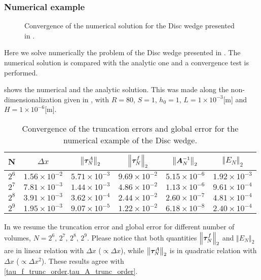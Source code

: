 \subsubsection*{Numerical example}
\begin{figure}[ht]
\centering 
\def\svgwidth{\textwidth}\small{
}\caption{
Convergence of the numerical solution for the Disc wedge presented in .
}\label{fig:discofinito_convergence}
\end{figure}

Here we solve numerically the problem of the Disc wedge presented in . The numerical solution is compared with the analytic one and a convergence test is performed.

 shows the numerical and the analytic solution. This was made along the non-dimensionalization given in , with $R=80$, $S=1$, $h_0=1$, $L=1\times 10^{-3}$[m] and $H=1\times 10^{-6}$[m].
\begin{table}[ht]
\centering
\begin{tabular}{cccccc}
\toprule
N & $\Delta x$ & $\left\Vert\boldsymbol{\tau}_N^A\right\Vert_2$ & $\left\Vert\boldsymbol{\tau}_N^f\right\Vert_2$ & $\left\Vert\boldsymbol{A}_N^{-1}\right\Vert_2$ & $\left\Vert E_N\right\Vert_2$\\
\midrule
{$2^6$} & {$1.56\times 10^{-2}$} & {$5.71\times 10^{-3}$} & {$9.69\times 10^{-2}$} & 
{$5.15\times 10^{-6}$}  & {$1.92\times 10^{-3}$} \\

{$2^7$} & {$7.81\times 10^{-3}$} & {$1.44\times 10^{-3}$} & {$4.86\times 10^{-2}$} & 
{$1.13\times 10^{-6}$}  & {$9.61\times 10^{-4}$} \\

{$2^8$} & {$3.91\times 10^{-3}$} & {$3.62\times 10^{-4}$} & {$2.44\times 10^{-2}$} & 
{$2.60\times 10^{-7}$}  & {$4.81\times 10^{-4}$} \\

{$2^9$} & {$1.95\times 10^{-3}$} & {$9.07\times 10^{-5}$} & {$1.22\times 10^{-2}$} & 
{$6.18\times 10^{-8}$} & {$2.40\times 10^{-4}$}  \\
\bottomrule
\end{tabular}
\caption{Convergence of the truncation errors and global error for the numerical example of the Disc wedge.}\label{tab:table_disc_wedge_convergence}
\end{table}

In  we resume the truncation error and global error for different number of volumes, $N=2^6,\,2^7,\,2^8,\,2^9$. Please notice that both quantities $\left\Vert\boldsymbol{\tau}_N^f\right\Vert_2$ and $\left\Vert E_N\right\Vert_2$ are in linear relation with $\Delta x$ ($\propto \Delta x$), while $\left\Vert\boldsymbol{\tau}_N^A\right\Vert_2$ is in quadratic relation with $\Delta x$ ($\propto \Delta x^2 $). These results agree with \eqref{tau_f_trunc_order,tau_A_trunc_order}.

